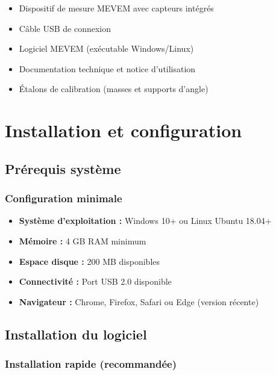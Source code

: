\documentclass[12pt,a4paper]{article}
\begin{document}
\begin{itemize}
    \item Dispositif de mesure MEVEM avec capteurs intégrés
    \item Câble USB de connexion
    \item Logiciel MEVEM (exécutable Windows/Linux)
    \item Documentation technique et notice d'utilisation
    \item Étalons de calibration (masses et supports d'angle)
\end{itemize}

\section{Installation et configuration}

\subsection{Prérequis système}

\subsubsection{Configuration minimale}
\begin{itemize}
    \item \textbf{Système d'exploitation :} Windows 10+ ou Linux Ubuntu 18.04+
    \item \textbf{Mémoire :} 4 GB RAM minimum
    \item \textbf{Espace disque :} 200 MB disponibles
    \item \textbf{Connectivité :} Port USB 2.0 disponible
    \item \textbf{Navigateur :} Chrome, Firefox, Safari ou Edge (version récente)
\end{itemize}

\subsection{Installation du logiciel}

\subsubsection{Installation rapide (recommandée)}
\end{document}
